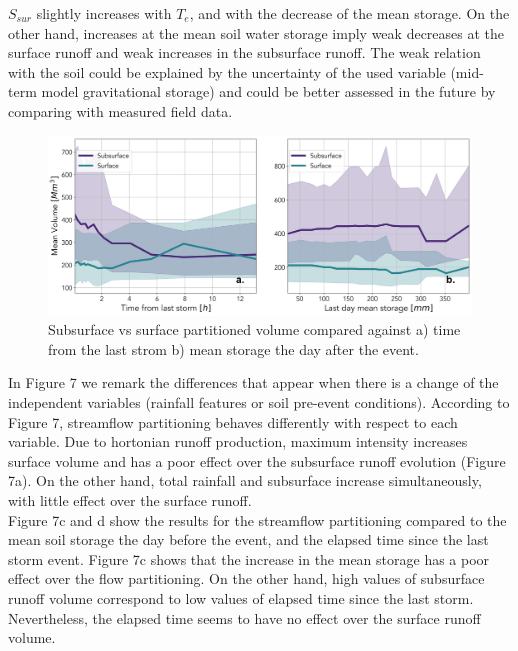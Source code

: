 \documentclass[preprint,12pt]{elsarticle}
\begin{document}
$S_{sur}$ slightly increases with $T_e$, and with the decrease of the mean storage.  On the other hand, increases at the mean soil water storage imply weak decreases at the surface runoff and weak increases in the subsurface runoff.  The weak relation with the soil could be explained by the uncertainty of the used variable (mid-term model gravitational storage) and could be better assessed in the future by comparing with measured field data.\\

\begin{figure}[!h]
    \centering
    \includegraphics[width=14cm]{Figuras/MeanVolumeVsSoil}
    \caption{Subsurface vs surface partitioned volume compared against a) time from the last strom b) mean storage the day after the event.}
    \label{fig:volumeVsSoil}
\end{figure}
In Figure 7 we remark the differences that appear when there is a change of the independent variables (rainfall features or soil pre-event conditions).  According to Figure 7, streamflow partitioning behaves differently with respect to each variable.  Due to hortonian runoff production, maximum intensity increases surface volume and has a poor effect over the subsurface runoff evolution (Figure 7a).  On the other hand, total rainfall and subsurface increase simultaneously, with little effect over the surface runoff.\\

Figure 7c and d show the results for the streamflow partitioning compared to the mean soil storage the day before the event, and the elapsed time since the last storm event. Figure 7c shows that the increase in the mean storage has a poor effect over the flow partitioning. On the other hand, high values of subsurface runoff volume correspond to low values of elapsed time since the last storm.  Nevertheless, the elapsed time seems to have no effect over the surface runoff volume.\\
\end{document}
